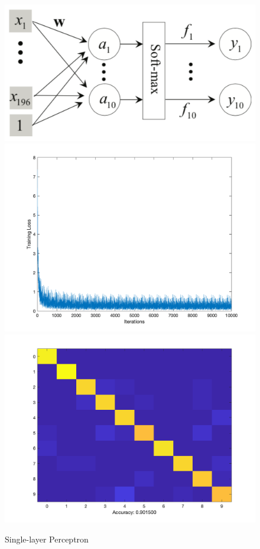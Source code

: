 \documentclass[letter, 10pt]{article}
\begin{document}
\begin{figure}[H]
        \centering
        \includegraphics[width=\textwidth]{HW4/RESULT/SLP.png}
    \endminipage\hfill
        \centering
        \includegraphics[width=1.1\textwidth]{HW4/RESULT/SLP_loss.png}
    \endminipage\hfill
        \centering
        \includegraphics[width=1.1\textwidth]{HW4/RESULT/SLP_CONFUSION.png}
    \endminipage\hfill
    \caption{Single-layer Perceptron}
\end{figure}
\end{document}
